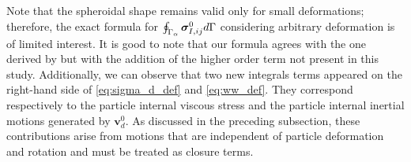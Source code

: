 Note that the spheroidal shape remains valid only for small deformations; therefore, the exact formula for $\oint_{\Gamma_{\alpha}} \bm\sigma_{I,ij}^0 d\Gamma$ considering arbitrary deformation is of limited interest. 
It is good to note that our formula agrees with the one derived by \citet{lhuillier1987phenomenology} but with the addition of the higher order term not present in this study. 
Additionally, we can observe that two new integrals terms appeared on the right-hand side of \ref{eq:sigma_d_def}  and \ref{eq:ww_def}. 
They correspond respectively to the particle internal viscous stress and the particle internal inertial motions generated by $\textbf{v}_d^0$.
As discussed in the preceding subsection, these contributions arise from motions that are independent of particle deformation and rotation and must be treated as closure terms. 




